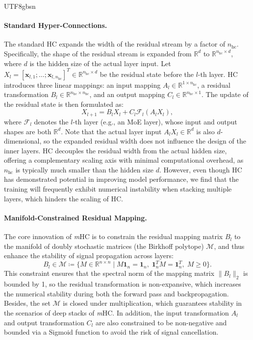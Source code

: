 \documentclass[11pt, a4paper, logo, copyright, nonumbering]{deepseek}
\newcommand{\mhc}{\textit{m}HC}
\begin{document}
\begin{CJK*}{UTF8}{gbsn}
\paragraph{Standard Hyper-Connections.}
The standard HC expands the width of the residual stream by a factor of $n_{\text{hc}}$. 
Specifically, the shape of the residual stream is expanded from $\mathbb{R}^{d}$ to $\mathbb{R}^{n_{\text{hc}} \times d}$, where $d$ is the hidden size of the actual layer input. 
Let $X_l = [\mathbf{x}_{l,1}; \ldots; \mathbf{x}_{l,n_{\text{hc}}}]^T \in \mathbb{R}^{n_{\text{hc}} \times d}$ be the residual state before the $l$-th layer. 
HC introduces three linear mappings: an input mapping $A_{l} \in \mathbb{R}^{1 \times n_{\text{hc}}}$, a residual transformation $B_{l} \in \mathbb{R}^{n_{\text{hc}} \times n_{\text{hc}}}$, and an output mapping $C_{l} \in \mathbb{R}^{n_{\text{hc}} \times 1}$. 
The update of the residual state is then formulated as:
\begin{equation}
    X_{l+1} = B_{l} X_l + C_{l} \mathcal{F}_{l}(A_{l} X_l),
\end{equation}
where $\mathcal{F}_{l}$ denotes the $l$-th layer (e.g., an MoE layer), whose input and output shapes are both $\mathbb{R}^{d}$.
Note that the actual layer input $A_{l} X_l \in \mathbb{R}^{d}$ is also $d$-dimensional, so the expanded residual width does not influence the design of the inner layers. 
HC decouples the residual width from the actual hidden size, offering a complementary scaling axis with minimal computational overhead, as $n_{\text{hc}}$ is typically much smaller than the hidden size $d$.
However, even though HC has demonstrated potential in improving model performance, we find that the training will frequently exhibit numerical instability when stacking multiple layers, which hinders the scaling of HC.

\paragraph{Manifold-Constrained Residual Mapping.}
The core innovation of \mhc{} is to constrain the residual mapping matrix $B_l$ to the manifold of doubly stochastic matrices (the Birkhoff polytope) $\mathcal{M}$, and thus enhance the stability of signal propagation across layers:
\begin{equation}
    B_l \in \mathcal{M} \coloneq \{ M \in \mathbb{R}^{n \times n} \mid M\mathbf{1}_n = \mathbf{1}_n, \; \mathbf{1}_n^T M = \mathbf{1}_n^T, \; M \geq 0 \}.
\end{equation}
This constraint ensures that the spectral norm of the mapping matrix $\|B_l\|_2$ is bounded by 1, so the residual transformation is non-expansive, which increases the numerical stability during both the forward pass and backpropagation.
Besides, the set $\mathcal{M}$ is closed under multiplication, which guarantees stability in the scenarios of deep stacks of \mhc{}. 
In addition, the input transformation $A_l$ and output transformation $C_l$ are also constrained to be non-negative and bounded via a Sigmoid function to avoid the risk of signal cancellation.


\end{CJK*}
\end{document}
